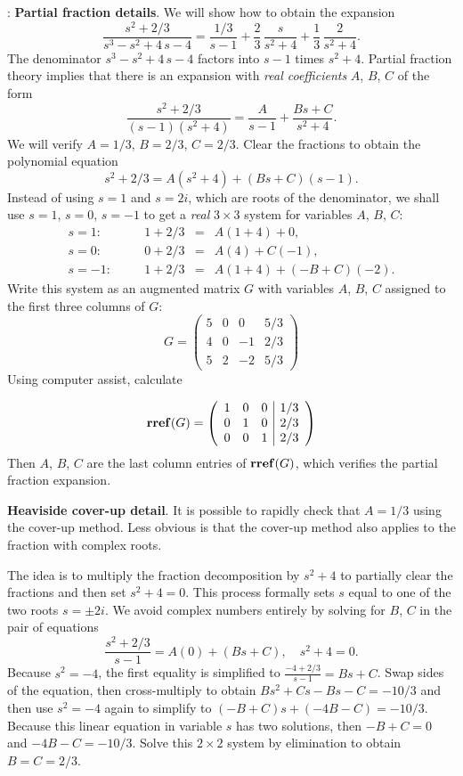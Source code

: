 \documentclass{article}
\def\df{\bfseries}
\def\dd{\displaystyle}
\def\BF#1{{\df #1}}
\def\EM#1{{\mdseries\itshape #1}}
\newenvironment{Solution}{\par\noindent{\sffamily\bfseries\upshape Solution}:\small\rm}{\par\medskip}
\def\rref{\mathop{{\bf rref}}\nolimits}
\begin{document}
\begin{Solution}
\BF{Partial fraction details}. We will show how to obtain the
expansion
$$
 \frac{{s}^{2}+2/3}{{s}^{3}-{s}^{2}+4\,s-4} = \frac{1/3}{s-1}+\frac23\,\frac
 {s}{{s}^{2}+4}+\frac13\,\frac {2}{{s}^{2}+4}.
$$
The denominator ${{s}^{3}-{s}^{2}+4\,s-4}$ factors into $s-1$
times $s^2+4$. Partial fraction theory implies that there is an
expansion with \EM{real coefficients} $A$, $B$, $C$ of the form
$$
 \frac{{s}^{2}+2/3}{(s-1)(s^2+4)} = \frac{A}{s-1}+\frac
 {Bs+C}{{s}^{2}+4}.
$$
We will verify $A=1/3$, $B=2/3$, $C=2/3$. Clear the fractions to
obtain the polynomial equation
$$
 {s}^{2}+2/3 = A(s^2+4)+(Bs+C)(s-1).
$$
Instead of using $s=1$ and $s=2i$, which are roots of the
denominator, we shall use $s=1$, $s=0$, $s=-1$ to get a \EM{real}
$3\times 3$ system for variables $A$, $B$, $C$:
$$
 \begin{array}{lclcl}
  s=1: &\quad & 1+2/3 &=& A(1+4)+0,\\
  s=0: &\quad & 0+2/3 &=& A(4) + C(-1), \\
  s=-1: &\quad & 1+2/3 &=& A(1+4)+(-B+C)(-2).
 \end{array}
$$
Write this system as an augmented matrix $G$ with variables $A$,
$B$, $C$ assigned to the first three columns of $G$:
$$
G=\left(\begin{array}{rrr|r}
 5 & 0 & 0 & 5/3 \\
 4 & 0 & -1 & 2/3 \\
 5 & 2 & -2 & 5/3
\end{array}\right)
$$
Using computer assist, calculate
%

$$
 \rref(G)=
 \left (\begin {array}{ccc|c}
 1&0&0&1/3\\
 0&1&0&2/3\\
 0&0&1&2/3
 \end {array}\right)
$$
Then $A$, $B$, $C$ are the last column entries of $\rref(G)$,
which verifies the partial fraction expansion.

\BF{Heaviside cover-up detail}. It is possible to rapidly check
that $A=1/3$ using the cover-up method. Less obvious is that the
cover-up method also applies to the fraction with complex roots.

The idea is to multiply the fraction decomposition by $s^2+4$ to
partially clear the fractions and then set $s^2+4=0$. This process
formally sets $s$ equal to one of the two roots $s=\pm 2i$. We
avoid complex numbers entirely by solving for $B$, $C$ in the pair
of equations
$$ \frac{s^2+2/3}{s-1} = A(0) + (Bs+C),\quad s^2+4=0.$$
Because $s^2=-4$, the first equality is simplified to
$\dd\frac{-4+2/3}{s-1}=Bs+C$. Swap sides of the equation, then
cross-multiply to obtain $Bs^2+Cs-Bs-C=-10/3$ and then use
$s^2=-4$ again to simplify to $(-B+C)s+(-4B-C)=-10/3$. Because
this linear equation in variable $s$ has two solutions, then
$-B+C=0$ and $-4B-C=-10/3$. Solve this $2\times 2$ system by
elimination to obtain $B=C=2/3$.


\end{Solution}
\end{document}
